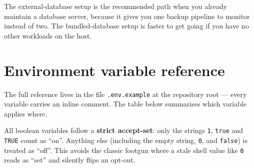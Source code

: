\begin{tip}
The external-database setup is the recommended path when you already
maintain a database server, because it gives you one backup pipeline
to monitor instead of two. The bundled-database setup is faster to
get going if you have no other workloads on the host.
\end{tip}

\section{Environment variable reference}\label{sec:env-vars}

The full reference lives in the file
\texttt{.env.example} at the repository
root — every variable carries an inline comment. The table below
summarises which variable applies where.

All boolean variables follow a \textbf{strict accept-set}: only the
strings \texttt{1}, \texttt{true} and \texttt{TRUE} count as
``on''. Anything else (including the empty string, \texttt{0}, and
\texttt{false}) is treated as ``off''. This avoids the classic
footgun where a stale shell value like \texttt{0} reads as ``set''
and silently flips an opt-out.

